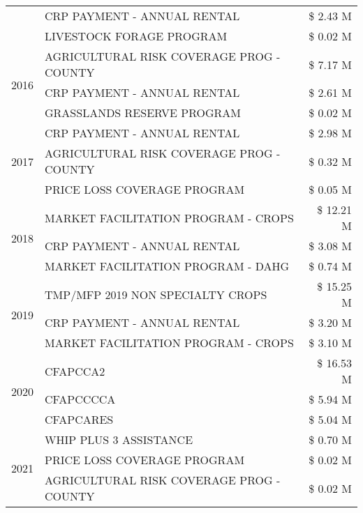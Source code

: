 \begin{tabular}{llr}
 & CRP PAYMENT - ANNUAL RENTAL & \$ 2.43 M \\
 & LIVESTOCK FORAGE PROGRAM & \$ 0.02 M \\
\cline{1-3}
\multirow[t]{3}{*}{2016} & AGRICULTURAL RISK COVERAGE PROG - COUNTY & \$ 7.17 M \\
 & CRP PAYMENT - ANNUAL RENTAL & \$ 2.61 M \\
 & GRASSLANDS RESERVE PROGRAM & \$ 0.02 M \\
\cline{1-3}
\multirow[t]{3}{*}{2017} & CRP PAYMENT - ANNUAL RENTAL & \$ 2.98 M \\
 & AGRICULTURAL RISK COVERAGE PROG - COUNTY & \$ 0.32 M \\
 & PRICE LOSS COVERAGE PROGRAM & \$ 0.05 M \\
\cline{1-3}
\multirow[t]{3}{*}{2018} & MARKET FACILITATION PROGRAM - CROPS & \$ 12.21 M \\
 & CRP PAYMENT - ANNUAL RENTAL & \$ 3.08 M \\
 & MARKET FACILITATION PROGRAM - DAHG & \$ 0.74 M \\
\cline{1-3}
\multirow[t]{3}{*}{2019} & TMP/MFP 2019 NON SPECIALTY CROPS & \$ 15.25 M \\
 & CRP PAYMENT - ANNUAL RENTAL & \$ 3.20 M \\
 & MARKET FACILITATION PROGRAM - CROPS & \$ 3.10 M \\
\cline{1-3}
\multirow[t]{3}{*}{2020} & CFAPCCA2 & \$ 16.53 M \\
 & CFAPCCCCA & \$ 5.94 M \\
 & CFAPCARES & \$ 5.04 M \\
\cline{1-3}
\multirow[t]{3}{*}{2021} & WHIP PLUS 3 ASSISTANCE & \$ 0.70 M \\
 & PRICE LOSS COVERAGE PROGRAM & \$ 0.02 M \\
 & AGRICULTURAL RISK COVERAGE PROG - COUNTY & \$ 0.02 M \\
\cline{1-3}
\bottomrule
\end{tabular}
